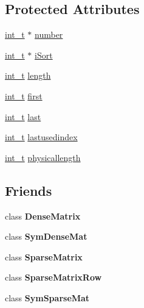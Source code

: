 \subsection*{Protected Attributes}
\begin{DoxyCompactItemize}
\item 
\hyperlink{_types_8hpp_ab6fd6105e64ed14a0c9281326f05e623}{int\+\_\+t} $\ast$ \hyperlink{class_indexlist_aebc85737bcca22d4e38a40b89f3d517a}{number}
\item 
\hyperlink{_types_8hpp_ab6fd6105e64ed14a0c9281326f05e623}{int\+\_\+t} $\ast$ \hyperlink{class_indexlist_a7cb0be705b2f365bd0e2a02726159625}{i\+Sort}
\item 
\hyperlink{_types_8hpp_ab6fd6105e64ed14a0c9281326f05e623}{int\+\_\+t} \hyperlink{class_indexlist_a615eead1528a5af66d40e5392f39b4b3}{length}
\item 
\hyperlink{_types_8hpp_ab6fd6105e64ed14a0c9281326f05e623}{int\+\_\+t} \hyperlink{class_indexlist_ac5fcce8e0f9c81e2b437b00144413dcd}{first}
\item 
\hyperlink{_types_8hpp_ab6fd6105e64ed14a0c9281326f05e623}{int\+\_\+t} \hyperlink{class_indexlist_a7c84090f4263d521f0c5ec586fdd83ad}{last}
\item 
\hyperlink{_types_8hpp_ab6fd6105e64ed14a0c9281326f05e623}{int\+\_\+t} \hyperlink{class_indexlist_af35ad1bcce6117b36f7247c248e322c4}{lastusedindex}
\item 
\hyperlink{_types_8hpp_ab6fd6105e64ed14a0c9281326f05e623}{int\+\_\+t} \hyperlink{class_indexlist_ad648cebc248309f0be3c6f3647cd944c}{physicallength}
\end{DoxyCompactItemize}
\subsection*{Friends}
\begin{DoxyCompactItemize}
\item 
\mbox{\label{class_indexlist_a429f2ee49f7ee672b5fcbd858afcd972}} 
class {\bfseries Dense\+Matrix}
\item 
\mbox{\label{class_indexlist_a5beabcf69cba4b4f91d6b8b3aaae3d72}} 
class {\bfseries Sym\+Dense\+Mat}
\item 
\mbox{\label{class_indexlist_a240abf68603784c3dcc4761f8bc41ad6}} 
class {\bfseries Sparse\+Matrix}
\item 
\mbox{\label{class_indexlist_a68f9c6f33847742616d4c74f06881475}} 
class {\bfseries Sparse\+Matrix\+Row}
\item 
\mbox{\label{class_indexlist_a769cc6bc95fb8501b74eb4eee3bb275b}} 
class {\bfseries Sym\+Sparse\+Mat}
\end{DoxyCompactItemize}



